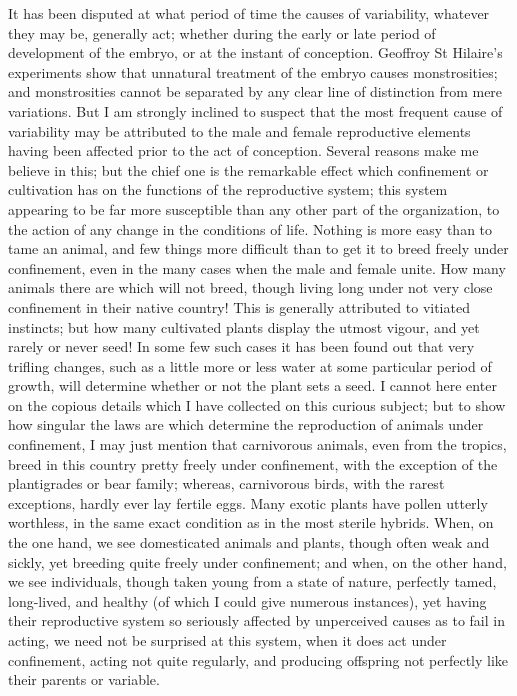 \indent It has been disputed at what period of time the causes of variability, whatever they may be, generally act; whether during the early or late period of development of the embryo, or at the instant of conception. Geoffroy St Hilaire's experiments show that unnatural treatment of the embryo causes monstrosities; and monstrosities cannot be separated by any clear line of distinction from mere variations. But I am strongly inclined to suspect that the most frequent cause of variability may be attributed to the male and female reproductive elements having been affected prior to the act of conception. Several reasons make me believe in this; but the chief one is the remarkable effect which confinement or cultivation has on the functions of the reproductive system; this system appearing to be far more susceptible than any other part of the organization, to the action of any change in the conditions of life. Nothing is more easy than to tame an animal, and few things more difficult than to get it to breed freely under confinement, even in the many cases when the male and female unite. How many animals there are which will not breed, though living long under not very close confinement in their native country! This is generally attributed to vitiated instincts; but how many cultivated plants display the utmost vigour, and yet rarely or never seed! In some few such cases it has been found out that very trifling changes, such as a little more or less water at some particular period of growth, will determine whether or not the plant sets a seed. I cannot here enter on the copious details which I have collected on this curious subject; but to show how singular the laws are which determine the reproduction of animals under confinement, I may just mention that carnivorous animals, even from the tropics, breed in this country pretty freely under confinement, with the exception of the plantigrades or bear family; whereas, carnivorous birds, with the rarest exceptions, hardly ever lay fertile eggs. Many exotic plants have pollen utterly worthless, in the same exact condition as in the most sterile hybrids. When, on the one hand, we see domesticated animals and plants, though often weak and sickly, yet breeding quite freely under confinement; and when, on the other hand, we see individuals, though taken young from a state of nature, perfectly tamed, long-lived, and healthy (of which I could give numerous instances), yet having their reproductive system so seriously affected by unperceived causes as to fail in acting, we need not be surprised at this system, when it does act under confinement, acting not quite regularly, and producing offspring not perfectly like their parents or variable.  \\
